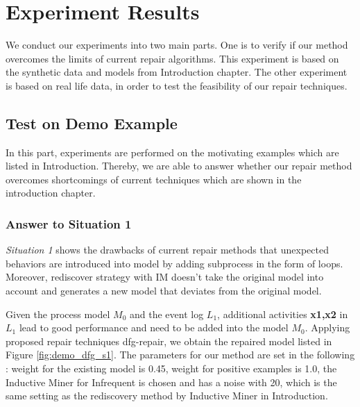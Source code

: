\section{Experiment Results}
We conduct our experiments into two main parts. One is to verify if our method overcomes the limits of current repair algorithms. This experiment is based on the synthetic data and models from Introduction chapter. The other experiment is based on real life data, in order to test the feasibility of our repair techniques.
 
\subsection{Test on Demo Example}
In this part, experiments are performed on the motivating examples which are listed in Introduction. Thereby, we are able to answer whether our repair method overcomes shortcomings of current techniques which are shown in the introduction chapter. 
\subsubsection{Answer to Situation 1}
\emph{Situation 1} shows the drawbacks of current repair methods \cite{fahland2015model, dees2017enhancing} that unexpected behaviors are introduced into model by adding subprocess in the form of loops. Moreover, rediscover strategy with IM doesn't take the original model into account and generates a new model that deviates from the original model. 


Given the process model $M_0$ and the event log $L_1$, additional activities \textbf{x1,x2} in $L_1$ lead to good performance and need to be added into the model $M_0$. Applying proposed repair techniques dfg-repair, we obtain the  repaired model listed in Figure \ref{fig:demo_dfg_s1}. The parameters for our method are set in the following : weight for the existing model is 0.45, weight for positive examples is 1.0, the Inductive Miner for Infrequent is chosen and has a noise with 20, which is the same setting as the rediscovery method by Inductive Miner in Introduction. 


